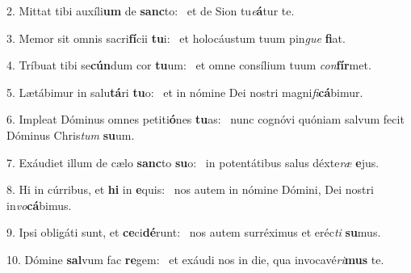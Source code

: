 2. Mittat tibi auxíli\textbf{um} de \textbf{sanc}to: \ast\  et de Sion tu\textit{e}\textbf{á}tur te.\

3. Memor sit omnis sacri\textbf{fí}cii \textbf{tu}i: \ast\  et holocáustum tuum pin\textit{gue} \textbf{fi}at.\

4. Tríbuat tibi se\textbf{cún}dum cor \textbf{tu}um: \ast\  et omne consílium tuum \textit{con}\textbf{fír}met.\

5. Lætábimur in salu\textbf{tá}ri \textbf{tu}o: \ast\  et in nómine Dei nostri magni\textit{fi}\textbf{cá}bimur.\

6. Impleat Dóminus omnes petiti\textbf{ó}nes \textbf{tu}as: \ast\  nunc cognóvi quóniam salvum fecit Dóminus Chris\textit{tum} \textbf{su}um.\

7. Exáudiet illum de cælo \textbf{sanc}to \textbf{su}o: \ast\  in potentátibus salus déxte\textit{ræ} \textbf{e}jus.\

8. Hi in cúrribus, et \textbf{hi} in \textbf{e}quis: \ast\  nos autem in nómine Dómini, Dei nostri in\textit{vo}\textbf{cá}bimus.\

9. Ipsi obligáti sunt, et \textbf{ce}ci\textbf{dé}runt: \ast\  nos autem surréximus et eréc\textit{ti} \textbf{su}mus.\

10. Dómine \textbf{sal}vum fac \textbf{re}gem: \ast\  et exáudi nos in die, qua invocavé\textit{ri}\textbf{mus} te.\

